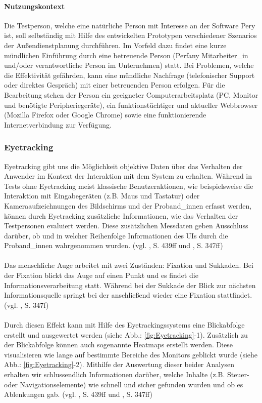 \documentclass[Bachelorarbeit.tex]{subfiles}
\begin{document}
\paragraph{Nutzungskontext}
\label{Nutzungskontext}
Die Testperson, welche eine natürliche Person mit Interesse an der Software Pery ist, soll selbständig mit Hilfe des entwickelten Prototypen verschiedener Szenarios der Außendienstplanung durchführen. 
Im Vorfeld dazu findet eine kurze mündlichen Einführung durch eine betreuende Person (Perfany Mitarbeiter\_in und/oder verantwortliche Person im Unternehmen) statt.
Bei Problemen, welche die Effektivität gefährden, kann eine mündliche Nachfrage (telefonischer Support oder direktes Gespräch) mit einer betreuenden Person erfolgen. 
Für die Bearbeitung stehen der Person ein geeigneter Computerarbeitsplatz (PC, Monitor und benötigte Peripheriegeräte), ein funktionstüchtiger und aktueller Webbrowser (Mozilla Firefox oder Google Chrome) sowie eine funktionierende Internetverbindung zur Verfügung.


\subsubsection{Eyetracking}
\label{Eyetracking}

Eyetracking gibt uns die Möglichkeit objektive Daten über das Verhalten der Anwender im Kontext der Interaktion mit dem System zu erhalten.
Während in Tests ohne Eyetracking meist klassische Benutzeraktionen, wie beispielsweise die Interaktion mit Eingabegeräten (z.B. Maus und Tastatur) oder Kameraaufzeichnungen des Bildschirms und der Proband\_innen erfasst werden, können durch Eyetracking zusätzliche Informationen, wie das Verhalten der Testpersonen evaluiert werden.
Diese zusätzlichen Messdaten geben Ausschluss darüber, ob und in welcher Reihenfolge Informationen des \ac{UI}s durch die Proband\_innen wahrgenommen wurden. (vgl. \cite{Niegemann2008}, S. 439ff und \cite{Burmester}, S. 347ff)\\
\\
Das menschliche Auge arbeitet mit zwei Zuständen: Fixation und Sukkaden.
Bei der Fixation blickt das Auge auf einen Punkt und es findet die Informationsverarbeitung statt. 
Während bei der Sukkade der Blick zur nächsten Informationsquelle springt bei der anschließend wieder eine Fixation stattfindet. (vgl. \cite{Burmester}, S. 347f)\\
\\
Durch diesen Effekt kann mit Hilfe des Eyetrackingssystems eine Blickabfolge erstellt und ausgewertet werden (siehe Abb.: \ref{fig:Eyetracking}-1).
Zusätzlich zu der Blickabfolge können auch sogenannte Heatmaps erstellt werden. 
Diese visualisieren wie lange auf bestimmte Bereiche des Monitors geblickt wurde (siehe Abb.: \ref{fig:Eyetracking}-2).
Mithilfe der Auswertung dieser beider Analysen erhalten wir schlussendlich Informationen darüber, welche Inhalte (z.B. Steuer- oder Navigationselemente) wie schnell und sicher gefunden wurden und ob es Ablenkungen gab. (vgl. \cite{Niegemann2008}, S. 439ff und \cite{Burmester}, S. 347ff)
\end{document}
